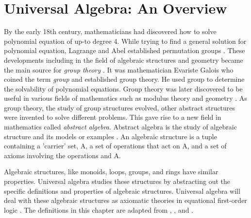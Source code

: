 \chapter{Universal Algebra: An Overview}
By the early 18th century, mathematicians had discovered how to solve polynomial
equation of up-to degree 4. While trying to find a general solution for
polynomial equation, Lagrange and Abel established permutation groups
\cite{barnett2017roots}. These developments including in the field of algebraic
structures and geometry became the main source for \textit{group theory}
\cite{enwiki:1145792803}. It was mathematician Evariste Galois who coined the
term \emph{group} and established group theory. He used group to determine the
solvability of polynomial equations. Group theory was later discovered to be
useful in various fields of mathematics such as modulus theory and geometry
\cite{enwiki:1107380309}. As group theory, the study of group structures
evolved, other abstract structures were invented to solve different problems.
This gave rise to a new field in mathematics called \emph{abstract algebra}.
Abstract algebra is the study of algebraic structure and its models or examples
\cite{enwiki:1107380309}. An algebraic structure is a tuple containing a
'carrier' set, A, a set of operations that act on A, and a set of axioms
involving the operations and A. 

Algebraic structures, like monoids, loops, groups, and rings have similar
properties. Universal algebra studies these structures by abstracting out the
specific definitions and properties of algebraic structures. Universal algebra
will deal with these algebraic structures as axiomatic theories in equational
first-order logic \cite{YSharoda}. The definitions in this chapter are adapted
from \cite{sankappanavar1981course}, \cite{YSharoda}, and
\cite{sannella2012foundations}.

